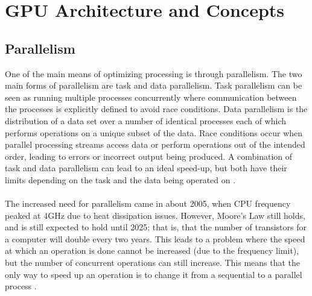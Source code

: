 \section{GPU Architecture and Concepts}\label{gpu}
\subsection{Parallelism}\label{gpu:sec:par}
One of the main means of optimizing processing is through parallelism. The two main forms of parallelism are task and data parallelism. Task parallelism can be seen as running multiple processes concurrently where communication between the processes is explicitly defined to avoid race conditions. Data parallelism is the distribution of a data set over a number of identical processes each of which performs operations on a unique subset of the data. Race conditions occur when parallel processing streams access data or perform operations out of the intended order, leading to errors or incorrect output being produced. A combination of task and data parallelism can lead to an ideal speed-up, but both have their limits depending on the task and the data being operated on \cite{subhlok1993exploiting}.
\\
\\
The increased need for parallelism came in about 2005, when CPU frequency peaked at 4GHz due to heat dissipation issues. However, Moore's Law still holds, and is still expected to hold until 2025; that is, that the number of transistors for a computer will double every two years. This leads to a problem where the speed at which an operation is done cannot be increased (due to the frequency limit), but the number of concurrent operations can still increase. This means that the only way to speed up an operation is to change it from a sequential to a parallel process \cite{rajan2013informatics}.
